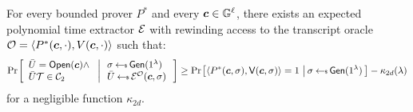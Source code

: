\begin{lemma}[Soundness]\label{lem:proximity2d_sound}
For every bounded prover $P^\ast$ and every $\bm{c}\in \mathbb{G}^\ell$, there exists an
expected polynomial time extractor $\mathcal{E}$ with
rewinding access to the transcript oracle $\mathcal{O}=\langle P^\ast(\bm{c},\cdot),V(\bm{c},\cdot)\rangle$
such that:
{\small
\begin{align*}
\condprob{
\begin{array}{l}
\bar{U} = \open(\bm{c}) \wedge \\
\bar{U}\mc{T}\in \mc{C}_2
\end{array}
}{
\begin{array}{l}
\sigma\sample \gen(\secparam) \\
\bar{U}\sample \extr^{\mc{O}}(\bm{c},\sigma)
\end{array}}
\geq 
\condprob{\langle P^\ast(\bm{c},\sigma),\verifier(\bm{c},\sigma)\rangle =
1}{\sigma\sample \gen(\secparam)} - \kappa_{2d}(\secpar)
\end{align*}
}
for a negligible function $\kappa_{2d}$.
\end{lemma}
